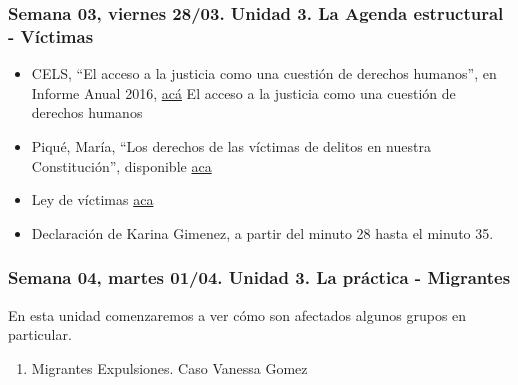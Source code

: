 \documentclass[
]{article}
\providecommand{\tightlist}{%
  \setlength{\itemsep}{0pt}\setlength{\parskip}{0pt}}
\begin{document}
\subsubsection{Semana 03, viernes 28/03. Unidad 3. La Agenda estructural
-
Víctimas}\label{semana-03-viernes-2803.-unidad-3.-la-agenda-estructural---vuxedctimas}

\begin{itemize}
\item
  CELS, ``El acceso a la justicia como una cuestión de derechos
  humanos'', en Informe Anual 2016,
  \href{https://drive.google.com/file/d/1qH6DsnHctmesy6nje2f5NgCyowQ0PkyM/view?usp=sharing}{acá}
  El acceso a la justicia como una cuestión de derechos humanos
\item
  Piqué, María, ``Los derechos de las víctimas de delitos en nuestra
  Constitución'', disponible
  \href{https://drive.google.com/file/d/1NaUqgIjcAosZx6OCPuJzcdG3sbKrqfaC/view?usp=sharing}{aca}
\item
  Ley de víctimas
  \href{https://servicios.infoleg.gob.ar/infolegInternet/anexos/275000-279999/276819/norma.htm}{aca}
\item
  Declaración de Karina Gimenez, a partir del minuto 28 hasta el minuto
  35.
\end{itemize}

\subsubsection{Semana 04, martes 01/04. Unidad 3. La práctica -
Migrantes}\label{semana-04-martes-0104.-unidad-3.-la-pruxe1ctica---migrantes}

En esta unidad comenzaremos a ver cómo son afectados algunos grupos en
particular.

\begin{enumerate}
\def\labelenumi{\alph{enumi}.}
\tightlist
\item
  Migrantes Expulsiones. Caso Vanessa Gomez
\end{enumerate}
\end{document}
